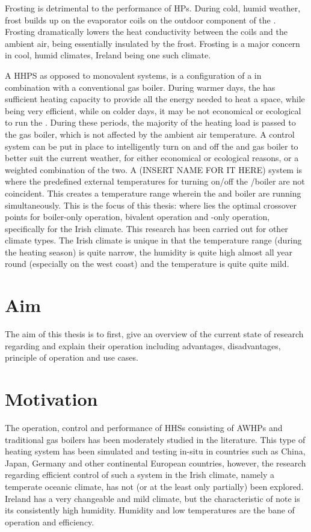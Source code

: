 Frosting is detrimental to the performance of \acp{HP}. During cold, humid weather, frost builds up on the evaporator coils on the outdoor component of the \HP. Frosting dramatically lowers the heat conductivity between the coils and the ambient air, being essentially insulated by the frost. Frosting is a major concern in cool, humid climates, Ireland being one such climate.

A \ac{HHPS} as opposed to monovalent systems, is a configuration of a \HP in combination with a conventional gas boiler. During warmer days, the \HP has sufficient heating capacity to provide all the energy needed to heat a space, while being very efficient, while on colder days, it may be not economical or ecological to run the \HP. During these periods, the majority of the heating load is passed to the gas boiler, which is not affected by the ambient air temperature. A control system can be put in place to intelligently turn on and off the \HP and gas boiler to better suit the current weather, for either economical or ecological reasons, or a weighted combination of the two. A (INSERT NAME FOR IT HERE) system is where the predefined external temperatures for turning on/off the \HP/boiler are not coincident. This creates a temperature range wherein the \HP and boiler are running simultaneously. This is the focus of this thesis: where lies the optimal crossover points for boiler-only operation, bivalent operation and \HP-only operation, specifically for the Irish climate. This research has been carried out for other climate types. The Irish climate is unique in that the temperature range (during the heating season) is quite narrow, the humidity is quite high almost all year round (especially on the west coast) and the temperature is quite quite mild.  

\section{Aim}
The aim of this thesis is to first, give an overview of the current state of research regarding \HPs and explain their operation including advantages, disadvantages, principle of operation and use cases. 

\section{Motivation}
The operation, control and performance of \acp{HHS} consisting of \acp{AWHP} and traditional gas boilers has been moderately studied in the literature. This type of heating system has been simulated and testing in-situ in countries such as China, Japan, Germany and other continental European countries, however, the research regarding efficient control of such a system in the Irish climate, namely a temperate oceanic climate, has not (or at the least only partially) been explored. Ireland has a very changeable and mild climate, but the characteristic of note is its consistently high humidity. Humidity and low temperatures are the bane of \HP operation and efficiency.

